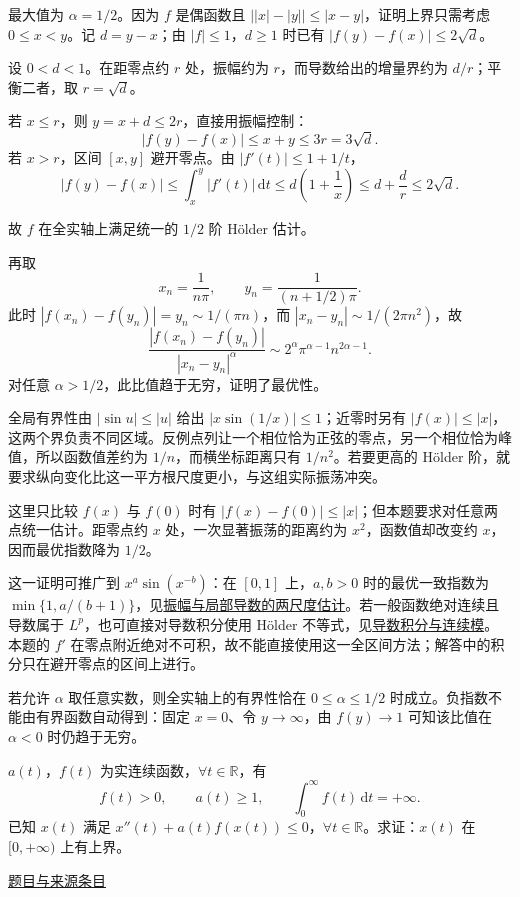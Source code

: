 \documentclass[12pt,fontset=fandol]{ctexart}
\begin{document}
\begin{solve}\label{ans:fin06-lo:7}

最大值为 $\alpha=1/2$。因为 $f$ 是偶函数且 $\bigl||x|-|y|\bigr|\le|x-y|$，证明上界只需考虑 $0\le x<y$。记 $d=y-x$；由 $|f|\le1$，$d\ge1$ 时已有 $|f(y)-f(x)|\le2\sqrt d$。

设 $0<d<1$。在距零点约 $r$ 处，振幅约为 $r$，而导数给出的增量界约为 $d/r$；平衡二者，取 $r=\sqrt d$。

若 $x\le r$，则 $y=x+d\le2r$，直接用振幅控制：
\[
|f(y)-f(x)|\le x+y\le3r=3\sqrt d.
\]
若 $x>r$，区间 $[x,y]$ 避开零点。由 $|f'(t)|\le1+1/t$，
\[
|f(y)-f(x)|
\le\int_x^y|f'(t)|\,\mathrm dt
\le d\left(1+\frac1x\right)
\le d+\frac d r\le2\sqrt d.
\]

故 $f$ 在全实轴上满足统一的 $1/2$ 阶 Hölder 估计。

再取
\[
x_n=\frac1{n\pi},\qquad y_n=\frac1{(n+1/2)\pi}.
\]
此时 $|f(x_n)-f(y_n)|=y_n\sim1/(\pi n)$，而 $|x_n-y_n|\sim1/(2\pi n^2)$，故
\[
\frac{|f(x_n)-f(y_n)|}{|x_n-y_n|^\alpha}
\sim2^\alpha\pi^{\alpha-1}n^{2\alpha-1}.
\]
对任意 $\alpha>1/2$，此比值趋于无穷，证明了最优性。

全局有界性由 $|\sin u|\le|u|$ 给出 $|x\sin(1/x)|\le1$；近零时另有 $|f(x)|\le|x|$，这两个界负责不同区域。反例点列让一个相位恰为正弦的零点，另一个相位恰为峰值，所以函数值差约为 $1/n$，而横坐标距离只有 $1/n^2$。若要更高的 Hölder 阶，就要求纵向变化比这一平方根尺度更小，与这组实际振荡冲突。

\end{solve}

\begin{remark}[方法与条件]这里只比较 $f(x)$ 与 $f(0)$ 时有 $|f(x)-f(0)|\le|x|$；但本题要求对任意两点统一估计。距零点约 $x$ 处，一次显著振荡的距离约为 $x^2$，函数值却改变约 $x$，因而最优指数降为 $1/2$。

这一证明可推广到 $x^a\sin(x^{-b})$：在 $[0,1]$ 上，$a,b>0$ 时的最优一致指数为 $\min\{1,a/(b+1)\}$，见\hyperref[app:estimate-holder]{振幅与局部导数的两尺度估计}。若一般函数绝对连续且导数属于 $L^p$，也可直接对导数积分使用 Hölder 不等式，见\hyperref[app:estimate-derivative]{导数积分与连续模}。本题的 $f'$ 在零点附近绝对不可积，故不能直接使用这一全区间方法；解答中的积分只在避开零点的区间上进行。

若允许 $\alpha$ 取任意实数，则全实轴上的有界性恰在 $0\le\alpha\le1/2$ 时成立。负指数不能由有界函数自动得到：固定 $x=0$、令 $y\to\infty$，由 $f(y)\to1$ 可知该比值在 $\alpha<0$ 时仍趋于无穷。\end{remark}

\begin{example}[来源序号8]\label{ex:fin06-lo:8}\label{pr:fin06-lo:8}

$a(t)$，$f(t)$ 为实连续函数，$\forall t\in\mathbb{R}$，有
\[
f(t)>0,\qquad a(t)\ge1,\qquad \int_0^{\infty}f(t)\,\mathrm{d}t=+\infty .
\]
已知 $x(t)$ 满足 $x''(t)+a(t)f(x(t))\le0$，$\forall t\in\mathbb{R}$。求证：$x(t)$ 在 $[0,+\infty)$ 上有上界。

\par\href{https://github.com/lzxcr/cmc-mathematics/blob/64916fa1fdbc3e444a652eca204d5669058ee321/src/problems/finals/06/08.md}{题目与来源条目}

\end{example}
\end{document}
